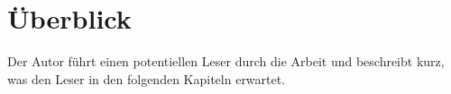 \begin{comment}
    practical application of \ac{E2E} verifiable voting systems and to that extend secure-multiparty computation protocols on resource-constrained devices is lacking. 

This reasearch aims to contribute to the literature by gaining insights into the practical application of \ac{E2E} verifiable voting systems and secure-multiparty computation protocols within the \ac{IoT environment}.


The field of SMPC has flourished with the rise of cloud computing
and data-sharing in IoT environments. However, the literature on
the practical application of SMPC protocols on resource-constrained
devices is lacking. Prior research has mostly been focused on devel-
oping secure protocols and testing them in virtual environments,
rather than on devices like an Arduino. Therefore, this research aims
to contribute to the literature by gaining insights into the practical
\end{comment}


\section{Überblick}
Der Autor führt einen potentiellen Leser durch die Arbeit und beschreibt kurz, was den Leser in den folgenden Kapiteln erwartet.




